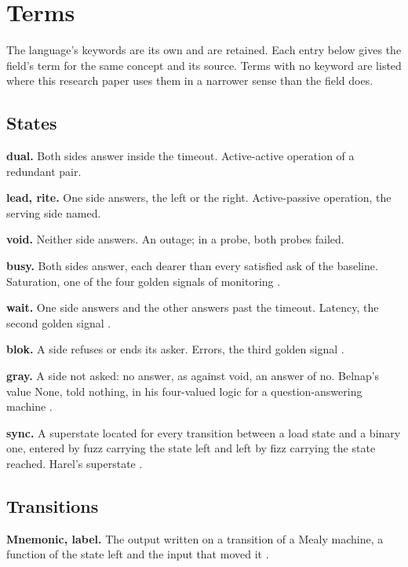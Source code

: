 \chapter{Terms}
\label{ch:terms}

The language's keywords are its own and are retained. Each entry below gives the field's term for
the same concept and its source. Terms with no keyword are listed where this research paper uses
them in a narrower sense than the field does.

\section{States}

\noindent\textbf{dual.} Both sides answer inside the timeout. Active-active operation of a
redundant pair.

\noindent\textbf{lead, rite.} One side answers, the left or the right. Active-passive operation,
the serving side named.

\noindent\textbf{void.} Neither side answers. An outage; in a probe, both probes failed.

\noindent\textbf{busy.} Both sides answer, each dearer than every satisfied ask of the baseline.
Saturation, one of the four golden signals of monitoring \cite{src:SRE}.

\noindent\textbf{wait.} One side answers and the other answers past the timeout. Latency, the
second golden signal \cite{src:SRE}.

\noindent\textbf{blok.} A side refuses or ends its asker. Errors, the third golden signal
\cite{src:SRE}.

\noindent\textbf{gray.} A side not asked: no answer, as against void, an answer of no. Belnap's
value None, told nothing, in his four-valued logic for a question-answering machine
\cite{src:Belnap}.

\noindent\textbf{sync.} A superstate located for every transition between a load state and a
binary one, entered by fuzz carrying the state left and left by fizz carrying the state reached.
Harel's superstate \cite{src:Harel}.

\section{Transitions}

\noindent\textbf{Mnemonic, label.} The output written on a transition of a Mealy machine, a
function of the state left and the input that moved it \cite{src:Mealy}.

